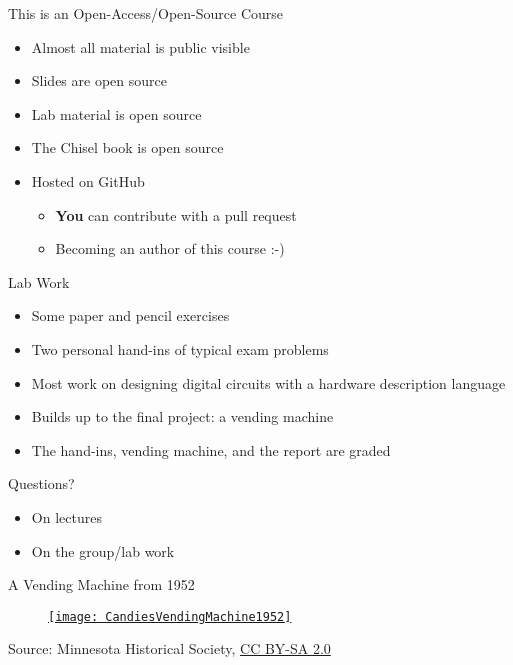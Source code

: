 \begin{frame}[fragile]{This is an Open-Access/Open-Source Course}
\begin{itemize}
\item Almost all material is public visible
\item Slides are open source
\item Lab material is open source
\item The Chisel book is open source
\item Hosted on GitHub
\begin{itemize}
\item \textbf{You} can contribute with a pull request
\item Becoming an author of this course :-)
\end{itemize}
\end{itemize}
\end{frame}

\begin{frame}[fragile]{Lab Work}
\begin{itemize}
\item Some paper and pencil exercises
\item Two personal hand-ins of typical exam problems
\item Most work on designing digital circuits with a hardware description language
\item Builds up to the final project: a vending machine
\item The hand-ins, vending machine, and the report are graded
\end{itemize}
\end{frame}

\begin{frame}[fragile]{Questions?}
\begin{itemize}
\item On lectures
\item On the group/lab work
\end{itemize}
\end{frame}

\begin{frame}[fragile]{A Vending Machine from 1952}
\begin{figure}
    \centering
    \href{https://en.wikipedia.org/wiki/File:CandiesVendingMachine1952.jpg}{\texttt{[image: CandiesVendingMachine1952]}}

\end{figure}

{\tiny Source: Minnesota Historical Society, \href{https://creativecommons.org/licenses/by-sa/2.0}{CC BY-SA 2.0}}
\end{frame}


